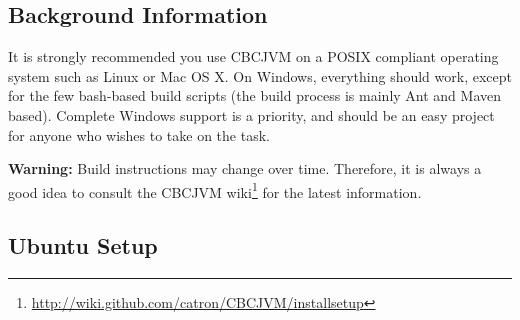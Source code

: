 \documentclass[12pt,letterpaper]{article}
\newcommand{\urlfootnote}[1]{\footnote{\url{#1}}}
\begin{document}
\subsection{Background Information}

It is strongly recommended you use CBCJVM on a POSIX compliant operating system such as Linux or Mac OS X. On Windows, everything should work, except for the few bash-based build scripts (the build process is mainly Ant and Maven based). Complete Windows support is a priority, and should be an easy project for anyone who wishes to take on the task.

\textbf{Warning:} Build instructions may change over time. Therefore, it is always a good idea to consult the CBCJVM wiki\urlfootnote{http://wiki.github.com/catron/CBCJVM/installsetup} for the latest information.

\subsection{Ubuntu Setup}
\end{document}
